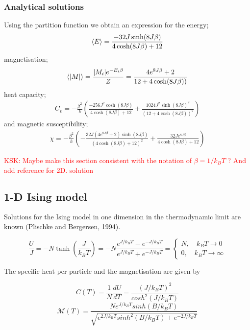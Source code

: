 \documentclass[11pt,a4paper,english]{article}
\numberwithin{equation}{section}
\newcommand{\magM}{\mathcal{M}}
\begin{document}
\subsubsection{Analytical solutions}
Using the partition function we obtain an expression for the energy;
\begin{gather}
\expval{E} = \frac{-32J\sinh(8J\beta)}{4\cosh(8J\beta)+12}
\end{gather}
magnetisation;
\begin{gather}
\expval{\abs{M}} = \frac{\abs{M_i}e^{-E_i\beta}}{Z}
= \frac{4e^{8J\beta} + 2}{12+4\cosh(8J\beta))}
\end{gather}
heat capacity;
\begin{gather}
C_v = -\frac{\beta^2}{k}\left(\frac{-256J^2\cosh(8J\beta)}{4\cosh(8J\beta) + 12}
 + \frac{1024J^2\sinh(8J\beta)^2}{(12+4\cosh(8J\beta))^2}\right)
\end{gather}
and magnetic susceptibility;
\begin{gather}
\chi = -\frac{\beta^2}{k}\left(- \frac{32 J \left(4 e^{8 J \beta} + 2\right) \sinh{\left (8 J \beta \right )}}{
\left(4 \cosh{\left (8 J \beta \right )} + 12\right)^{2}} 
+ \frac{32 J e^{8 J \beta}}{4 \cosh(8 J \beta) + 12}\right)
\end{gather}




\textcolor{red}{KSK: Maybe make this section consistent with the notation of $\beta = 1/ k_B T$ ? And add reference for 2D. solution}

\subsection{1-D Ising model}
Solutions for the Ising model in one dimension in the 
thermodynamic limit are known (Plischke and Bergersen, 1994). 

\begin{equation}
\frac{U}{J} = -N \tanh \left( \frac{J}{k_B T} \right) = -N \frac{e^{J/k_B T}-e^{-J/k_B T} }{e^{J/k_B T}+ e^{-J/k_B T} } =  \begin{cases} N, \quad k_B T \to 0 \\ 0, \quad  k_B T \to \infty \end{cases}
\end{equation}

The specific heat per particle and the magnetisation are given by 

\begin{equation}
C(T) = \frac{1}{N} \frac{dU}{dT} = \frac{(J/k_B T)^2}{cosh^2 (J/k_B T)}
\end{equation}
\begin{equation}
\magM(T) = \frac{N e^{J / k_B T} sinh(B/k_B T) }{ \sqrt{ e^{2J/k_B T} sinh^2 (B/k_B T) + e^{-2J/ k_B T}  } }
\end{equation}
\end{document}
